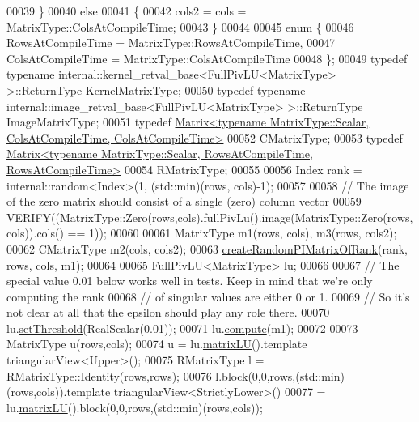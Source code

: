 \begin{DoxyCode}
00039   \}
00040   \textcolor{keywordflow}{else}
00041   \{
00042     cols2 = cols = MatrixType::ColsAtCompileTime;
00043   \}
00044 
00045   \textcolor{keyword}{enum} \{
00046     RowsAtCompileTime = MatrixType::RowsAtCompileTime,
00047     ColsAtCompileTime = MatrixType::ColsAtCompileTime
00048   \};
00049   \textcolor{keyword}{typedef} \textcolor{keyword}{typename} internal::kernel\_retval\_base<FullPivLU<MatrixType> >::ReturnType KernelMatrixType;
00050   \textcolor{keyword}{typedef} \textcolor{keyword}{typename} internal::image\_retval\_base<FullPivLU<MatrixType> >::ReturnType ImageMatrixType;
00051   \textcolor{keyword}{typedef} 
      \hyperlink{group___core___module_class_eigen_1_1_matrix}{Matrix<typename MatrixType::Scalar, ColsAtCompileTime, ColsAtCompileTime>}
00052           CMatrixType;
00053   \textcolor{keyword}{typedef} 
      \hyperlink{group___core___module_class_eigen_1_1_matrix}{Matrix<typename MatrixType::Scalar, RowsAtCompileTime, RowsAtCompileTime>}
00054           RMatrixType;
00055 
00056   Index rank = internal::random<Index>(1, (std::min)(rows, cols)-1);
00057 
00058   \textcolor{comment}{// The image of the zero matrix should consist of a single (zero) column vector}
00059   VERIFY((MatrixType::Zero(rows,cols).fullPivLu().image(MatrixType::Zero(rows,cols)).cols() == 1));
00060 
00061   MatrixType m1(rows, cols), m3(rows, cols2);
00062   CMatrixType m2(cols, cols2);
00063   \hyperlink{namespace_eigen_a0d9a7ddcee5c7c8defaba3628455efb2}{createRandomPIMatrixOfRank}(rank, rows, cols, m1);
00064 
00065   \hyperlink{group___l_u___module_class_eigen_1_1_full_piv_l_u}{FullPivLU<MatrixType>} lu;
00066 
00067   \textcolor{comment}{// The special value 0.01 below works well in tests. Keep in mind that we're only computing the rank}
00068   \textcolor{comment}{// of singular values are either 0 or 1.}
00069   \textcolor{comment}{// So it's not clear at all that the epsilon should play any role there.}
00070   lu.\hyperlink{group___l_u___module_a414592d82de98f5bd075965caf56d681}{setThreshold}(RealScalar(0.01));
00071   lu.\hyperlink{group___l_u___module_a0a3c3b1bbafa31a03567a4573ebabc79}{compute}(m1);
00072 
00073   MatrixType u(rows,cols);
00074   u = lu.\hyperlink{group___l_u___module_afea0b8fc707a9097d46fe358cb18bbff}{matrixLU}().template triangularView<Upper>();
00075   RMatrixType l = RMatrixType::Identity(rows,rows);
00076   l.block(0,0,rows,(std::min)(rows,cols)).template triangularView<StrictlyLower>()
00077     = lu.\hyperlink{group___l_u___module_afea0b8fc707a9097d46fe358cb18bbff}{matrixLU}().block(0,0,rows,(std::min)(rows,cols));

\end{DoxyCode}
